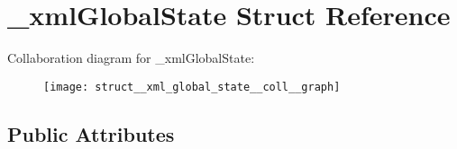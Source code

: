 \hypertarget{struct__xml_global_state}{\section{\-\_\-xml\-Global\-State Struct Reference}
\label{struct__xml_global_state}
}


Collaboration diagram for \-\_\-xml\-Global\-State\-:
\nopagebreak
\begin{figure}[H]
\begin{center}
\leavevmode
\texttt{[image: struct\_\_xml\_global\_state\_\_coll\_\_graph]}
\end{center}
\end{figure}
\subsection*{Public Attributes}
